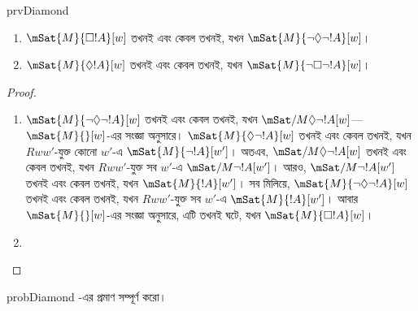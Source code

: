 \documentclass[../../../include/open-logic-section]{subfiles}
\begin{document}
\begin{tagblock}{prvDiamond}
\begin{prop}
  \begin{enumerate}
  \item $\mSat{M}{\Box !A}[w]$ তখনই এবং কেবল তখনই, যখন $\mSat{M}{\lnot\Diamond\lnot !A}[w]$।
  \item $\mSat{M}{\Diamond !A}[w]$ তখনই এবং কেবল তখনই, যখন $\mSat{M}{\lnot\Box\lnot !A}[w]$।
  \end{enumerate}
\end{prop}

\begin{proof}
  \begin{enumerate}
    \item $\mSat{M}{\lnot\Diamond\lnot !A}[w]$ তখনই এবং কেবল তখনই, যখন $\mSat/{M}{\Diamond\lnot
      !A}[w]$—$\mSat{M}{}[w]$-এর সংজ্ঞা অনুসারে। $\mSat{M}{\Diamond\lnot
      !A}[w]$ তখনই এবং কেবল তখনই, যখন $Rww'$-যুক্ত কোনো $w'$-এ $\mSat{M}{\lnot
      !A}[w']$। অতএব, $\mSat/{M}{\Diamond\lnot !A}[w]$ তখনই এবং কেবল
    তখনই, যখন $Rww'$-যুক্ত সব $w'$-এ $\mSat/{M}{\lnot !A}[w']$। আরও,
    $\mSat/{M}{\lnot !A}[w']$ তখনই এবং কেবল তখনই, যখন $\mSat{M}{!A}[w']$।
    সব মিলিয়ে, $\mSat{M}{\lnot\Diamond\lnot !A}[w]$ তখনই এবং কেবল
    তখনই, যখন $Rww'$-যুক্ত সব $w'$-এ $\mSat{M}{!A}[w']$। আবার
    $\mSat{M}{}[w]$-এর সংজ্ঞা অনুসারে, এটি তখনই ঘটে, যখন
    $\mSat{M}{\Box !A}[w]$।
    \item {}
  \end{enumerate}
\end{proof}

\begin{probtag}{probDiamond}
  -এর প্রমাণ সম্পূর্ণ করো।
\end{probtag}
\end{tagblock}
\end{document}
